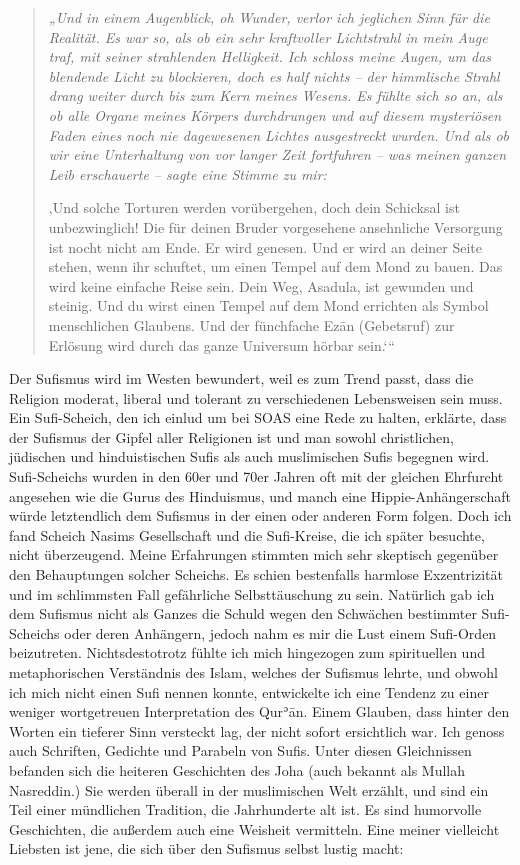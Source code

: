 \documentclass[12pt]{memoir}
\def\´{ʾ} %
\def \Quran{Qur\-\´ān} %
\def\–{-\hskip0pt}
\begin{document}
\begin{quote}
\itshape
„Und in einem Augenblick, oh Wunder,
verlor ich jeglichen Sinn für die Realität.
Es war so, als ob ein sehr kraftvoller Lichtstrahl in mein Auge traf,
mit seiner strahlenden Helligkeit.
Ich schloss meine Augen, um das blendende Licht zu blockieren,
doch es half nichts –
der himmlische Strahl drang weiter durch bis zum Kern meines Wesens.
Es fühlte sich so an, als ob alle Organe meines Körpers durchdrungen
und auf diesem mysteriösen Faden eines noch nie dagewesenen Lichtes
ausgestreckt wurden.
Und als ob wir eine Unterhaltung von vor langer Zeit fortfuhren –
was meinen ganzen Leib erschauerte –
sagte eine Stimme zu mir:

‚Und solche Torturen werden vorübergehen,
doch dein Schicksal ist unbezwinglich!
Die für deinen Bruder vorgesehene ansehnliche Versorgung
ist nocht nicht am Ende.
Er wird genesen.
Und er wird an deiner Seite stehen, wenn ihr schuftet,
um einen Tempel auf dem Mond zu bauen.
Das wird keine einfache Reise sein.
Dein Weg, Asadula, ist gewunden und steinig.
Und du wirst einen Tempel auf dem Mond errichten
als Symbol menschlichen Glaubens.
Und der fünchfache Ezān (Gebetsruf) zur Erlösung
wird durch das ganze Universum hörbar sein.‘“
\end{quote}

Der Sufismus wird im Westen bewundert, weil es zum Trend passt,
dass die Religion moderat, liberal
und tolerant zu verschiedenen Lebensweisen sein muss.
Ein Sufi-Scheich, den ich einlud um bei SOAS eine Rede zu halten,
erklärte, dass der Sufismus der Gipfel aller Religionen ist
und man sowohl christlichen, jüdischen und hinduistischen Sufis
als auch muslimischen Sufis begegnen wird.
Sufi-Scheichs wurden in den 60er und 70er Jahren
oft mit der gleichen Ehrfurcht angesehen wie die Gurus des Hinduismus,
und manch eine Hippie-Anhängerschaft würde letztendlich dem Sufismus
in der einen oder anderen Form folgen.
Doch ich fand Scheich Nasims Gesellschaft
und die Sufi\–Kreise, die ich später besuchte, nicht überzeugend.
Meine Erfahrungen stimmten mich sehr skeptisch
gegenüber den Behauptungen solcher Scheichs.
Es schien bestenfalls harmlose Exzentrizität
und im schlimmsten Fall gefährliche Selbsttäuschung zu sein.
Natürlich gab ich dem Sufismus nicht als Ganzes die Schuld
wegen den Schwächen bestimmter Sufi-Scheichs oder deren Anhängern,
jedoch nahm es mir die Lust einem Sufi\–Orden beizutreten.
Nichtsdestotrotz fühlte ich mich hingezogen
zum spirituellen und metaphorischen Verständnis des Islam,
welches der Sufismus lehrte,
und obwohl ich mich nicht einen Sufi nennen konnte,
entwickelte ich eine Tendenz
zu einer weniger wortgetreuen Interpretation des \Quran.
Einem Glauben, dass hinter den Worten ein tieferer Sinn versteckt lag,
der nicht sofort ersichtlich war.
Ich genoss auch Schriften, Gedichte und Parabeln von Sufis.
Unter diesen Gleichnissen befanden sich die heiteren Geschichten des Joha
(auch bekannt als Mullah Nasreddin.)
Sie werden überall in der muslimischen Welt erzählt,
und sind ein Teil einer mündlichen Tradition, die Jahrhunderte alt ist.
Es sind humorvolle Geschichten, die außerdem auch eine Weisheit vermitteln.
Eine meiner vielleicht Liebsten ist jene,
die sich über den Sufismus selbst lustig macht:
\end{document}
